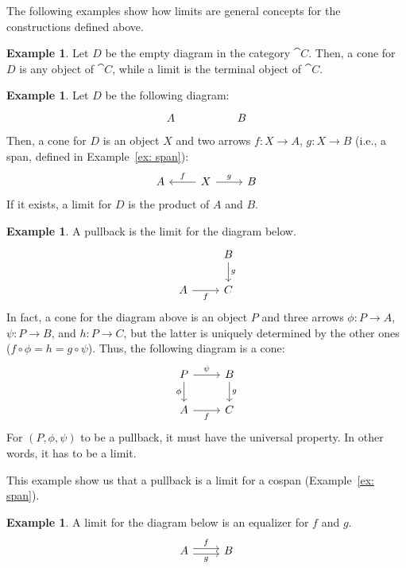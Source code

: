 \documentclass[a4paper, twoside,openright]{report}
\theoremstyle{plain}
\theoremstyle{definition}
\newtheorem{example}[theorem]{Example}
\begin{document}
The following examples show how limits are general concepts for the constructions defined above.

\begin{example}
    Let $D$ be the empty diagram in the category $\cat C$. Then, a cone for $D$ is any object of $\cat C$, while a limit is the terminal object of $\cat C$.
\end{example}

\begin{example}\label{ex:product_are_limits}
    Let $D$ be the following diagram:
    \[
        \begin{tikzcd}
            A & & B
        \end{tikzcd}
    \]
    Then, a cone for $D$ is an object $X$ and two arrows $f: X \rightarrow A$, $g: X \rightarrow B$ (i.e., a span, defined in Example~\ref{ex: span}):
    \[
        \begin{tikzcd}
            A & X \arrow[l, "f" swap] \arrow[r, "g"] & B
        \end{tikzcd}
    \]
    If it exists, a limit for $D$ is the product of $A$ and $B$.
\end{example}

\begin{example}\label{ex:pb_as_limit}
    A pullback is the limit for the diagram below.
    \[
        \begin{tikzcd}
            & B \arrow[d, "g"] \\
            A \arrow[r, "f" swap] & C
        \end{tikzcd}
    \]
    In fact, a cone for the diagram above is an object $P$ and three arrows $\phi:P \rightarrow A$, $\psi: P \rightarrow B$, and $h: P \rightarrow C$, but the latter is uniquely determined by the other ones ($f \circ \phi = h = g \circ \psi$).
    Thus, the following diagram is a cone:
    \[
        \begin{tikzcd}
            P \arrow[r, "{\psi}"] \arrow[d, "{\phi}" swap] & B \arrow[d, "g"] \\
            A \arrow[r, "f" swap] & C
        \end{tikzcd}
    \]
    For $(P, \phi, \psi)$ to be a pullback, it must have the universal property. In other words, it has to be a limit.

    This example show us that a pullback is a limit for a cospan (Example~\ref{ex: span}).
\end{example}

\begin{example}\label{ex:equaliz_are_limits}
    A limit for the diagram below is an equalizer for $f$ and $g$.
    \[
        \begin{tikzcd}
            A \arrow[r, shift left, "f"] \arrow[r, shift right,"g"swap] & B
        \end{tikzcd}
    \]
\end{example}
\end{document}
